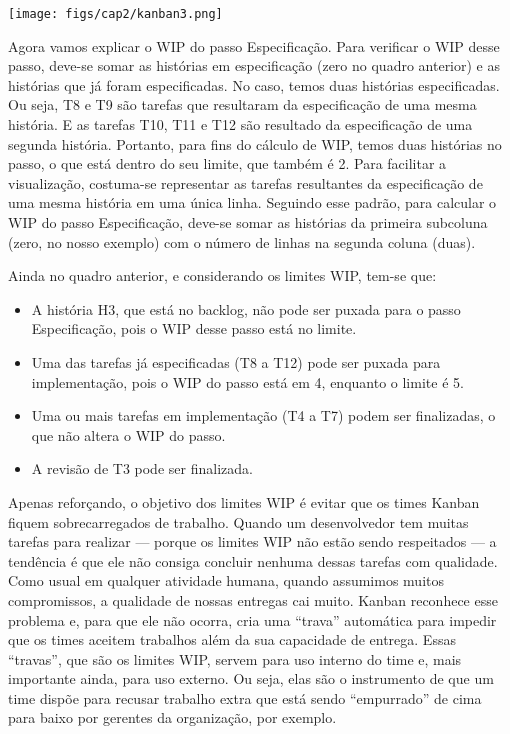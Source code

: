 \documentclass[
  11pt,
  twoside]{book}
\begin{document}
\texttt{[image: figs/cap2/kanban3.png]}

Agora vamos explicar o WIP do passo Especificação. Para verificar o WIP
desse passo, deve-se somar as histórias em especificação (zero no quadro
anterior) e as histórias que já foram especificadas. No caso, temos duas
histórias especificadas. Ou seja, T8 e T9 são tarefas que resultaram da
especificação de uma mesma história. E as tarefas T10, T11 e T12 são
resultado da especificação de uma segunda história. Portanto, para fins
do cálculo de WIP, temos duas histórias no passo, o que está dentro do
seu limite, que também é 2. Para facilitar a visualização, costuma-se
representar as tarefas resultantes da especificação de uma mesma
história em uma única linha. Seguindo esse padrão, para calcular o WIP
do passo Especificação, deve-se somar as histórias da primeira subcoluna
(zero, no nosso exemplo) com o número de linhas na segunda coluna
(duas).

Ainda no quadro anterior, e considerando os limites WIP, tem-se que:

\begin{itemize}
\item
  A história H3, que está no backlog, não pode ser puxada para o passo
  Especificação, pois o WIP desse passo está no limite.
\item
  Uma das tarefas já especificadas (T8 a T12) pode ser puxada para
  implementação, pois o WIP do passo está em 4, enquanto o limite é 5.
\item
  Uma ou mais tarefas em implementação (T4 a T7) podem ser finalizadas,
  o que não altera o WIP do passo.
\item
  A revisão de T3 pode ser finalizada.
\end{itemize}

Apenas reforçando, o objetivo dos limites WIP é evitar que os times
Kanban fiquem sobrecarregados de trabalho. Quando um desenvolvedor tem
muitas tarefas para realizar --- porque os limites WIP não estão sendo
respeitados --- a tendência é que ele não consiga concluir nenhuma
dessas tarefas com qualidade. Como usual em qualquer atividade humana,
quando assumimos muitos compromissos, a qualidade de nossas entregas cai
muito. Kanban reconhece esse problema e, para que ele não ocorra, cria
uma ``trava'' automática para impedir que os times aceitem trabalhos
além da sua capacidade de entrega. Essas ``travas'', que são os limites
WIP, servem para uso interno do time e, mais importante ainda, para uso
externo. Ou seja, elas são o instrumento de que um time dispõe para
recusar trabalho extra que está sendo ``empurrado'' de cima para baixo
por gerentes da organização, por exemplo.
\end{document}
